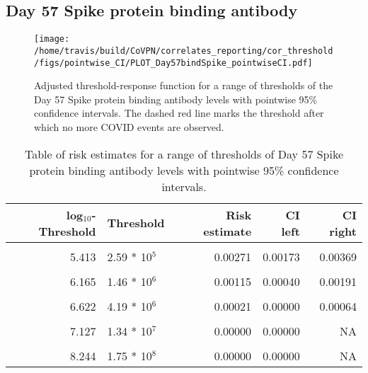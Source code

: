 \documentclass[]{book}
\theoremstyle{definition}
\theoremstyle{definition}
\theoremstyle{definition}
\newcommand{\1}{\mathbbm{1}}
\begin{document}
\newpage

\newpage

\hypertarget{day-57-spike-protein-binding-antibody}{%
\subsection{Day 57 Spike protein binding antibody}\label{day-57-spike-protein-binding-antibody}}

\begin{figure}[H]
\centering
\texttt{[image: /home/travis/build/CoVPN/correlates\_reporting/cor\_threshold/figs/pointwise\_CI/PLOT\_Day57bindSpike\_pointwiseCI.pdf]}
\caption{Adjusted threshold-response function for a range of thresholds of the
  Day 57 Spike protein binding antibody levels with pointwise 95\% confidence intervals. The dashed red line marks the threshold after which no more COVID events are observed. }
\end{figure}
\begin{table}[!h]

\caption{\label{tab:unnamed-chunk-347}Table of risk estimates for a range of thresholds of Day 57 Spike protein binding antibody levels with pointwise 95\% confidence intervals.}
\centering
\begin{tabular}[t]{rlrrr}
\toprule
log$_{10}$-Threshold & Threshold & Risk estimate & CI left & CI right\\
\midrule
\cellcolor{gray!6}{4.536} & \cellcolor{gray!6}{3.44 * 10$^4$} & \cellcolor{gray!6}{0.00480} & \cellcolor{gray!6}{0.00353} & \cellcolor{gray!6}{0.00608}\\
5.413 & 2.59 * 10$^5$ & 0.00271 & 0.00173 & 0.00369\\
\cellcolor{gray!6}{5.797} & \cellcolor{gray!6}{6.27 * 10$^5$} & \cellcolor{gray!6}{0.00172} & \cellcolor{gray!6}{0.00090} & \cellcolor{gray!6}{0.00255}\\
6.165 & 1.46 * 10$^6$ & 0.00115 & 0.00040 & 0.00191\\
\cellcolor{gray!6}{6.405} & \cellcolor{gray!6}{2.54 * 10$^6$} & \cellcolor{gray!6}{0.00079} & \cellcolor{gray!6}{0.00008} & \cellcolor{gray!6}{0.00150}\\
6.622 & 4.19 * 10$^6$ & 0.00021 & 0.00000 & 0.00064\\
\cellcolor{gray!6}{6.820} & \cellcolor{gray!6}{6.61 * 10$^6$} & \cellcolor{gray!6}{0.00028} & \cellcolor{gray!6}{0.00000} & \cellcolor{gray!6}{0.00087}\\
7.127 & 1.34 * 10$^7$ & 0.00000 & 0.00000 & NA\\
\cellcolor{gray!6}{7.409} & \cellcolor{gray!6}{2.56 * 10$^7$} & \cellcolor{gray!6}{0.00000} & \cellcolor{gray!6}{0.00000} & \cellcolor{gray!6}{NA}\\
8.244 & 1.75 * 10$^8$ & 0.00000 & 0.00000 & NA\\
\bottomrule
\end{tabular}
\end{table}
\end{document}
